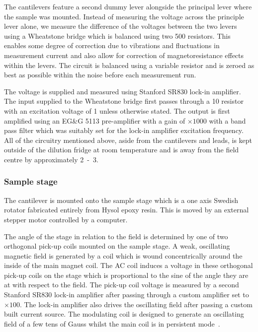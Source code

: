 The cantilevers feature a second dummy lever alongside the principal lever where the sample was mounted. Instead of measuring the voltage across the principle lever alone, we measure the difference of the voltages between the two levers using a Wheatstone bridge which is balanced using two \unit{500}{\ohm} resistors. This enables some degree of correction due to vibrations and fluctuations in measurement current and also allow for correction of magnetoresistance effects within the levers. The circuit is balanced using a variable resistor and is zeroed as best as possible within the noise before each measurement run.

The voltage is supplied and measured using Stanford SR830 lock-in amplifier. The input supplied to the Wheatstone bridge first passes through a \unit{10}{\kilo\ohm} resistor with an excitation voltage of \unit{1}{\volt} unless otherwise stated. The output is first amplified using an EG\&G 5113 pre-amplifier with a gain of $\times1000$ with a band pass filter which was suitably set for the lock-in amplifier excitation frequency. All of the circuitry mentioned above, aside from the cantilevers and leads, is kept outside of the dilution fridge at room temperature and is away from the field centre by approximately \unit{2-3}{\metre}.

\subsubsection{Sample stage}

The cantilever is mounted onto the sample stage which is a one axis Swedish rotator fabricated entirely from Hysol epoxy resin. This is moved by an external stepper motor controlled by a computer. 

The angle of the stage in relation to the field is determined by one of two orthogonal pick-up coils mounted on the sample stage. A weak, oscillating magnetic field is generated by a coil which is wound concentrically around the inside of the main magnet coil. The AC coil induces a voltage in these orthogonal pick-up coils on the stage which is proportional to the sine of the angle they are at with respect to the field. The pick-up coil voltage is measured by a second Stanford SR830 lock-in amplifier after passing through a custom amplifier set to $\times100$. The lock-in amplifier also drives the oscillating field after passing a custom built current source. The modulating coil is designed to generate an oscillating field of a few tens of Gauss whilst the main coil is in persistent mode~\cite{Instruments1998}.

